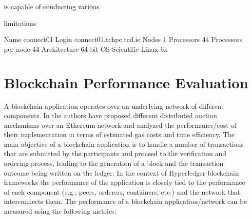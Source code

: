 is capable of conducting various 


limitations

\textbf{
}


Name
connect01
Login
connect01.tchpc.tcd.ie
Nodes
1
Processors
44
Processors per node
44
Architecture
64-bit
OS
Scientific Linux 6x




\section{Blockchain Performance Evaluation}
A blockchain application operates over an underlying network of different components. In \cite{10.1007/978-3-030-16946-6_5,10.1007/978-3-662-58820-8_18} the authors have proposed different distributed auction mechanisms over an Ethereum network and analyzed the performance/cost of their implementation in terms of estimated gas costs and time efficiency. 
The main objective of a blockchain application is to handle a number of transactions that are submitted by the participants and proceed to the verification and ordering process, leading to the generation of a block and the transaction outcome being written on the ledger.
In the context of Hyperledger blockchain frameworks the performance of the application is closely tied to the performance of each component (e.g., peers, orderers, containers, etc.) and the network that interconnects them. The performance of a blockchain application/network can be measured using the following metrics:


